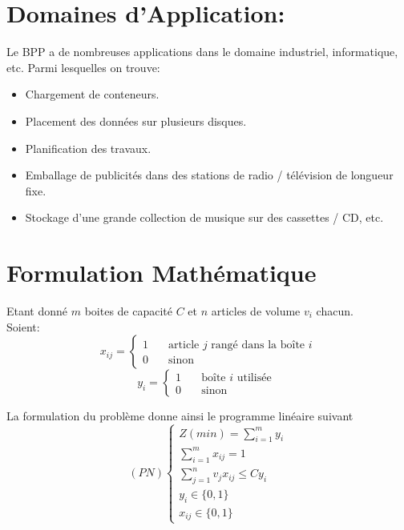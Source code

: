 \documentclass[class=report, crop=false]{standalone}
\begin{document}
    \section{Domaines d'Application:}
Le BPP a de nombreuses applications dans le domaine industriel, informatique, etc. Parmi lesquelles on trouve:
    \renewcommand{\labelitemi}{$\circ$}  
    \begin{itemize}
        \item Chargement de conteneurs.
        \item Placement des données sur plusieurs disques.
        \item Planification des travaux.
        \item Emballage de publicités dans des stations de radio / télévision de longueur fixe.
        \item Stockage d’une grande collection de musique sur des cassettes / CD, etc.
    \end{itemize}
    \section{Formulation Mathématique}
    Etant donné \(m\) boites de capacité \(C\) et \(n\) articles de volume \(v_i\) chacun. \\
    Soient: 
    \[ x_{ij} =
        \begin{cases}
            1  & \quad \text{article } j \text{ rangé dans la boîte } i \\
            0  & \quad \text{sinon } 
        \end{cases}
    \]
\[ y_i =
    \begin{cases}
        1  & \quad \text{boîte } i \text{ utilisée } \\
        0  & \quad \text{sinon } 
    \end{cases}
\]

La formulation du problème donne ainsi le programme linéaire suivant
\[(PN)
    \begin{cases}
        Z(min) = \displaystyle\sum_{i=1}^{m} y_i \\
        \displaystyle\sum_{i=1}^{m} x_{ij}  = 1 \\
        \displaystyle\sum_{j=1}^{n} v_j x_{ij} \le C y_i \\
        y_i \in \{0,1\} \\
        x_{ij} \in \{0,1\} 
    \end{cases}
\]  
\end{document}
